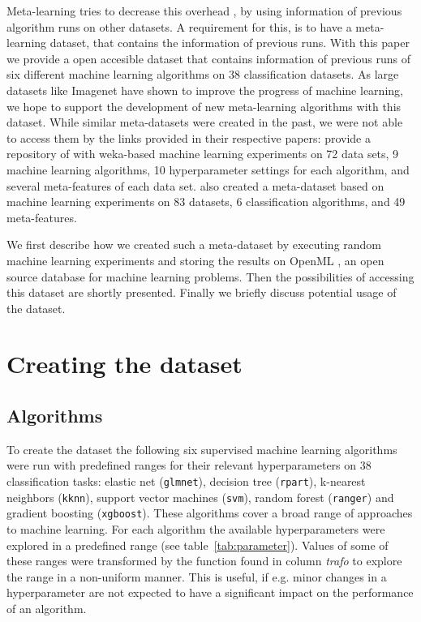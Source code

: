 \documentclass{article}
\begin{document}
Meta-learning tries to decrease this overhead \citep{Feurer2015}, by using information of previous algorithm runs on other datasets. A requirement for this, is to have a meta-learning dataset, that contains the information of previous runs. With this paper we provide a open accesible dataset that contains information of previous runs of six different machine learning algorithms on 38 classification datasets. As large datasets like Imagenet \citep{ImageNet2009} have shown to improve the progress of machine learning, we hope to support the development of new meta-learning algorithms with this dataset. While similar meta-datasets were created in the past, we were not able to access them by the links provided in their respective papers: \citet{2014arXiv1405.7292S} provide a repository of with weka-based machine learning experiments on 72 data sets, 9 machine learning algorithms, 10 hyperparameter settings for each algorithm, and several meta-features of each data set. \citet{Reif2012ACD} also created a meta-dataset based on machine learning experiments on 83 datasets, 6 classification algorithms, and 49 meta-features. 

We first describe how we created such a meta-dataset by executing random machine learning experiments and storing the results on OpenML \citep{OpenML2013}, an open source database for machine learning problems. Then the possibilities of accessing this dataset are shortly presented. Finally we briefly discuss potential usage of the dataset. 


\section{Creating the dataset}

\subsection{Algorithms}

To create the dataset the following six supervised machine learning algorithms were run with predefined ranges for their relevant hyperparameters on 38 classification tasks: elastic net (\texttt{glmnet}), decision tree (\texttt{rpart}), k-nearest neighbors (\texttt{kknn}), support vector machines (\texttt{svm}), random forest (\texttt{ranger}) and gradient boosting (\texttt{xgboost}). These algorithms cover a broad range of approaches to machine learning. For each algorithm the available hyperparameters were explored in a predefined range (see table~\ref{tab:parameter}). Values of some of these ranges were transformed by the function found in column \textit{trafo} to explore the range in a non-uniform manner. This is useful, if e.g. minor changes in a hyperparameter are not expected to have a significant impact on the performance of an algorithm.
\end{document}
